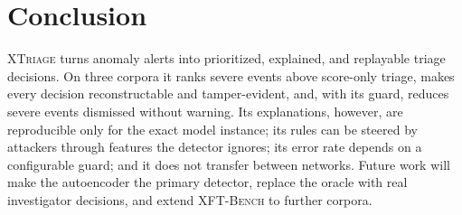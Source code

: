 \documentclass[journal]{IEEEtran}
\begin{document}
\section{Conclusion}
\label{sec:conclusion}
\textsc{XTriage} turns anomaly alerts into prioritized, explained, and replayable triage decisions. On three corpora it ranks severe events above score-only triage, makes every decision reconstructable and tamper-evident, and, with its guard, reduces severe events dismissed without warning. Its explanations, however, are reproducible only for the exact model instance; its rules can be steered by attackers through features the detector ignores; its error rate depends on a configurable guard; and it does not transfer between networks. Future work will make the autoencoder the primary detector, replace the oracle with real investigator decisions, and extend \textsc{XFT-Bench} to further corpora.
\end{document}
